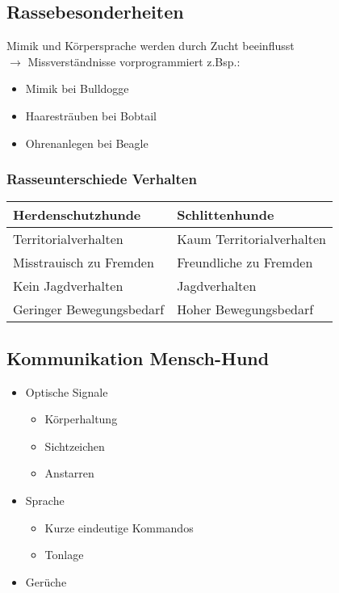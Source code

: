     \subsection{Rassebesonderheiten}
        Mimik und Körpersprache werden durch Zucht beeinflusst \\
        $\rightarrow$ Missverständnisse vorprogrammiert z.Bsp.:
        \begin{itemize}
            \item Mimik bei Bulldogge
            \item Haaresträuben bei Bobtail
            \item Ohrenanlegen bei Beagle
        \end{itemize}

        \subsubsection{Rasseunterschiede Verhalten}
            \begin{tabular}{l|l}
                \textbf{Herdenschutzhunde} & \textbf{Schlittenhunde} \\
                \hline
                Territorialverhalten & Kaum Territorialverhalten \\
                Misstrauisch zu Fremden & Freundliche zu Fremden \\
                Kein Jagdverhalten & Jagdverhalten \\
                Geringer Bewegungsbedarf & Hoher Bewegungsbedarf \\
            \end{tabular}

    \subsection{Kommunikation Mensch-Hund}
        \begin{itemize}
            \item Optische Signale
            \begin{itemize}
                \item Körperhaltung
                \item Sichtzeichen
                \item Anstarren
            \end{itemize}
            \item Sprache
            \begin{itemize}
                \item Kurze eindeutige Kommandos
                \item Tonlage
            \end{itemize}
            \item Gerüche
        \end{itemize}


